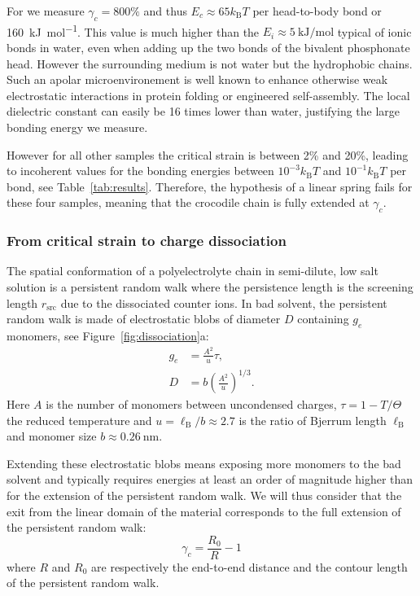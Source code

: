 \documentclass[journal=jacsat,manuscript=article]{achemso}
\begin{document}
For  we measure $\gamma_c = 800\%$ and thus $E_c \approx 65 k_\mathrm{B}T$ per head-to-body bond or \SI{160}{\kilo\joule\per\mol}. This value is much higher than the $E_i\approx\SI{5}{\kilo\joule\per\mol}$ typical of ionic bonds in water\cite{Schneider1992}, even when adding up the two bonds of the bivalent phosphonate head. However the surrounding medium is not water but the hydrophobic chains. Such an apolar microenvironement is well known to enhance otherwise weak electrostatic interactions in protein folding or engineered self-assembly\cite{Rehm2010}. The local dielectric constant can easily be 16 times lower than water, justifying the large bonding energy we measure.

However for all other samples the critical strain is between 2\% and 20\%, leading to incoherent values for the bonding energies between $10^{-3}k_\mathrm{B}T$ and $10^{-1}k_\mathrm{B}T$ per bond, see Table~\ref{tab:results}. Therefore, the hypothesis of a linear spring fails for these four samples, meaning that the crocodile chain is fully extended at $\gamma_c$.

\subsubsection{From critical strain to charge dissociation}

The spatial conformation of a polyelectrolyte chain in semi-dilute, low salt solution is a persistent random walk where the persistence length is the screening length $r_\mathrm{src}$ due to the dissociated counter ions\cite{Rubinstein1996}. In bad solvent, the persistent random walk is made of electrostatic blobs of diameter $D$ containing $g_e$ monomers, see Figure~\ref{fig:dissociation}a:
\begin{align}
g_e &= \frac{A^2}{u}\tau\label{eq:ge},\\
D &= b \left(\frac{A^2}{u}\right)^{1/3}\label{eq:D}.
\end{align}
Here $A$ is the number of monomers between uncondensed charges, $\tau = 1 - T/\Theta$ the reduced temperature and $u = \ell_\mathrm{B}/b \approx 2.7$ is the ratio of Bjerrum length $\ell_\mathrm{B}$ and monomer size $b\approx \SI{0.26}{\nano\metre}$. 

Extending these electrostatic blobs means exposing more monomers to the bad solvent and typically requires energies at least an order of magnitude higher than for the extension of the persistent random walk. We will thus consider that the exit from the linear domain of the material corresponds to the full extension of the persistent random walk:
\begin{equation}
\gamma_c = \frac{R_0}{R} - 1
\end{equation}
where $R$ and $R_0$ are respectively the end-to-end distance and the contour length of the persistent random walk.
\end{document}
